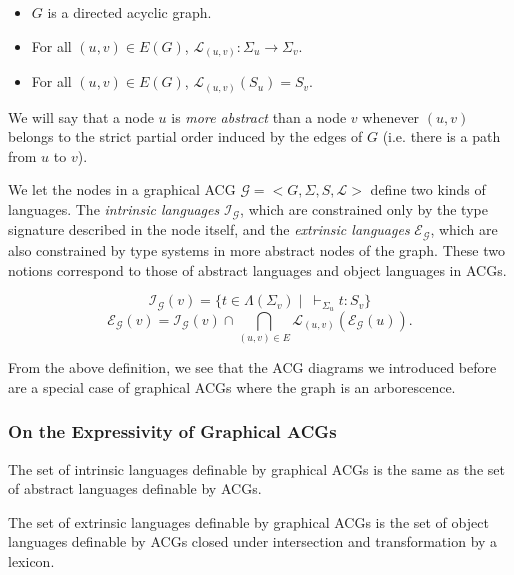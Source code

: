 \begin{itemize}
\item $G$ is a directed acyclic graph.
\item For all $(u,v) \in E(G)$, $\mathcal{L}_{(u,v)} : \Sigma_u \to
  \Sigma_v$.
\item For all $(u,v) \in E(G)$, $\mathcal{L}_{(u,v)}(S_u) = S_v$.
\end{itemize}

We will say that a node $u$ is \emph{more abstract} than a node $v$
whenever $(u,v)$ belongs to the strict partial order induced by the
edges of $G$ (i.e. there is a path from $u$ to $v$).

We let the nodes in a graphical ACG $\mathcal{G} = \mathopen{<} G,
\Sigma, S, \mathcal{L} \mathclose{>}$ define two kinds of
languages. The \emph{intrinsic languages} $\mathcal{I}_{\mathcal{G}}$,
which are constrained only by the type signature described in the node
itself, and the \emph{extrinsic languages} $\mathcal{E}_{\mathcal{G}}$,
which are also constrained by type systems in more abstract nodes of the
graph. These two notions correspond to those of abstract languages and
object languages in ACGs.

$$
\mathcal{I}_{\mathcal{G}}(v) = \{t \in \Lambda(\Sigma_v)
\mid\ \vdash_{\Sigma_u} t : S_v\}
$$
$$
\mathcal{E}_{\mathcal{G}}(v) = \mathcal{I}_{\mathcal{G}}(v) \cap
\bigcap_{(u,v) \in E} \mathcal{L}_{(u,v)}(\mathcal{E}_{\mathcal{G}}(u)).
$$

From the above definition, we see that the ACG diagrams we introduced
before are a special case of graphical ACGs where the graph is an
arborescence.

\subsubsection{On the Expressivity of Graphical ACGs}

\begin{observation}
  The set of intrinsic languages definable by graphical ACGs is the same
  as the set of abstract languages definable by ACGs.
\end{observation}

\begin{theorem}
  The set of extrinsic languages definable by graphical ACGs is the set
  of object languages definable by ACGs closed under intersection and
  transformation by a lexicon.
\end{theorem}

